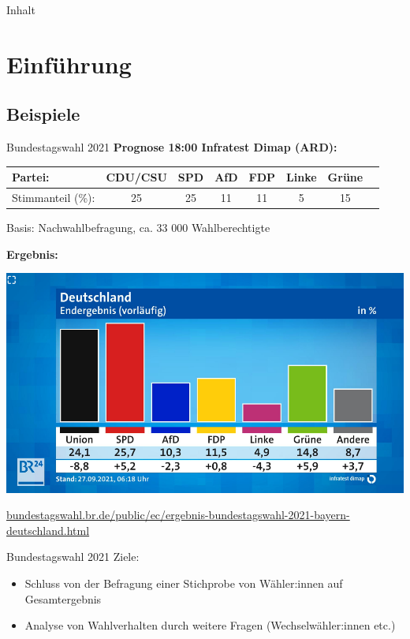 \documentclass[
  10pt,
  ignorenonframetext,
]{beamer}
\providecommand{\tightlist}{%
  \setlength{\itemsep}{0pt}\setlength{\parskip}{0pt}}
\begin{document}
\begin{frame}{Inhalt}
\label{inhalt}
\begin{multicols}{2}
\footnotesize
\tableofcontents[subsectionstyle=hide]
\end{multicols}
\end{frame}

\section{Einführung}\label{einfuxfchrung}

\subsection{Beispiele}\label{beispiele}

\begin{frame}{Bundestagswahl 2021}
\label{bundestagswahl-2021}
\textbf{Prognose 18:00 Infratest Dimap (ARD):}

\begin{tabular}{l|c|c|c|c|c|c|c}
  Partei: & CDU/CSU & SPD & AfD & FDP & Linke & Grüne\\
  \hline
  Stimmanteil (\%): & 25  & 25 & 11 & 11 & 5 & 15\\
\end{tabular}

Basis: Nachwahlbefragung, ca. 33 000 Wahlberechtigte

\textbf{Ergebnis:}

\begin{center}
  \includegraphics[width=.7\textwidth]{pics/bundestagswahl21-ergebnis.png}
\end{center}

\scriptsize\url{bundestagswahl.br.de/public/ec/ergebnis-bundestagswahl-2021-bayern-deutschland.html}
\end{frame}

\begin{frame}{Bundestagswahl 2021}
\label{bundestagswahl-2021-1}
Ziele:

\begin{itemize}
\tightlist
\item
  Schluss von der Befragung einer Stichprobe von Wähler:innen auf
  Gesamtergebnis
\item
  Analyse von Wahlverhalten durch weitere Fragen (Wechselwähler:innen
  etc.)
\end{itemize}
\end{frame}
\end{document}
